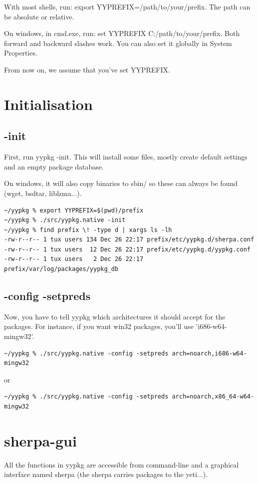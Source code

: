 \documentclass[a4paper]{article}
\begin{document}
With most shells, run: export YYPREFIX=/path/to/your/prefix. The path can be absolute or relative.

On windows, in cmd.exe, run: set YYPREFIX C:/path/to/your/prefix. Both forward and backward slashes work. You can also set it globally in System Properties.

From now on, we assume that you've set YYPREFIX.

\section{Initialisation}
\subsection{-init}
First, run yypkg -init. This will install some files, mostly create default settings and an empty package database.

On windows, it will also copy binaries to sbin/ so these can always be found (wget, bsdtar, liblzma...).

\begin{verbatim}
~/yypkg % export YYPREFIX=$(pwd)/prefix
~/yypkg % ./src/yypkg.native -init
~/yypkg % find prefix \! -type d | xargs ls -lh         
-rw-r--r-- 1 tux users 134 Dec 26 22:17 prefix/etc/yypkg.d/sherpa.conf
-rw-r--r-- 1 tux users  12 Dec 26 22:17 prefix/etc/yypkg.d/yypkg.conf
-rw-r--r-- 1 tux users   2 Dec 26 22:17 prefix/var/log/packages/yypkg_db
\end{verbatim}

\subsection{-config -setpreds}
Now, you have to tell yypkg which architectures it should accept for the packages. For instance, if you want win32 packages, you'll use 'i686-w64-mingw32'.
\begin{verbatim}
~/yypkg % ./src/yypkg.native -config -setpreds arch=noarch,i686-w64-mingw32
\end{verbatim}

or

\begin{verbatim}
~/yypkg % ./src/yypkg.native -config -setpreds arch=noarch,x86_64-w64-mingw32
\end{verbatim}

\section{sherpa-gui}
All the functions in yypkg are accessible from command-line and a graphical interface named sherpa (the sherpa carries packages to the yeti...).
\end{document}
